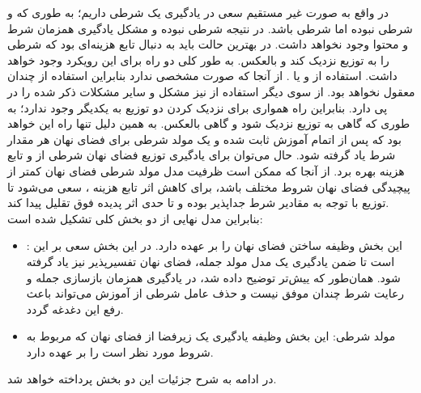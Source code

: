 در واقع به صورت غیر مستقیم سعی در یادگیری یک \wae{} شرطی داریم؛ به طوری که \encoder{} و \decoder{} شرطی نبوده اما \priordist{} شرطی باشد. در نتیجه \decoder{} شرطی نبوده و مشکل یادگیری همزمان شرط و محتوا وجود نخواهد داشت. در بهترین حالت باید به دنبال تابع هزینه‌ای بود که \priordist{} شرطی را به توزیع \marginal{} \encoder{} نزدیک کند و بالعکس. به طور کلی دو راه برای این رویکرد وجود خواهد داشت. استفاده از \gan{} و یا \mmd{}. از آنجا که \priordist{} صورت مشخصی ندارد بنابراین استفاده از  \mmd{} چندان معقول نخواهد بود. از سوی دیگر استفاده از \gan{} نیز مشکل \modecollapse{} و سایر مشکلات ذکر شده را در پی دارد. بنابراین راه همواری برای نزدیک کردن دو توزیع به یکدیگر وجود ندارد؛ به طوری که گاهی \priordist{} به توزیع \marginal{} \encoder{} نزدیک شود و گاهی بالعکس. به همین دلیل تنها راه این خواهد بود که پس از اتمام آموزش \autoencoder{} ثابت شده و یک مولد شرطی برای فضای نهان هر مقدار شرط یاد گرفته شود. حال می‌توان برای یادگیری توزیع فضای نهان شرطی از \normalizingflownet{} و تابع هزینه \maxlikelihood{} بهره برد. از آنجا که ممکن است ظرفیت مدل مولد شرطی فضای نهان کمتر از پیچیدگی فضای نهان شروط مختلف باشد، برای کاهش اثر \meanseeking{} تابع هزینه \maxlikelihood{}، سعی می‌شود تا توزیع \marginal{} \encoder{} با توجه به مقادیر شرط جدا‌پذیر بوده و تا حدی اثر پدیده فوق تقلیل پیدا کند.
\\
بنابراین مدل نهایی از دو بخش کلی تشکیل شده است:
\begin{itemize}
	\item \autoencoder{}:
	      این بخش وظیفه ساختن فضای نهان را بر عهده دارد. در این بخش سعی بر این است تا ضمن یادگیری یک مدل مولد جمله، فضای نهان تفسیرپذیر نیز یاد گرفته شود. همان‌طور که ییش‌تر توضیح داده شد، \vae{} در یادگیری همزمان بازسازی جمله و رعایت شرط چندان موفق نیست و حذف عامل شرطی از آموزش \decoder{} می‌تواند باعث رفع این دغدغه گردد.
	\item
	      مولد شرطی: این بخش وظیفه یادگیری یک زیرفضا از فضای نهان که مربوط به شروط مورد نظر است را بر عهده دارد.
\end{itemize}
در ادامه به شرح جزئیات این دو بخش پرداخته خواهد شد.


